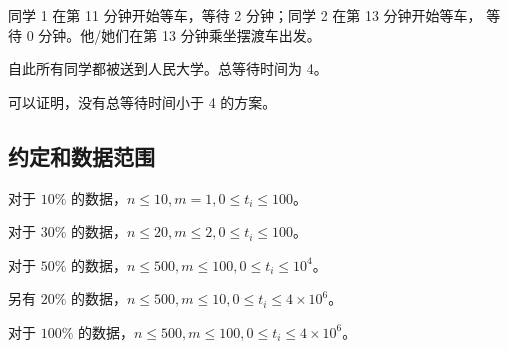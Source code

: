 \documentclass[UTF8]{ctexart}
\begin{document}
同学 1 在第 11 分钟开始等车，等待 2 分钟；同学 2 在第 13 分钟开始等车， 等待 0 分钟。他/她们在第 13 分钟乘坐摆渡车出发。

自此所有同学都被送到人民大学。总等待时间为 4。

可以证明，没有总等待时间小于 4 的方案。

\subsection{约定和数据范围}

对于 $10\%$ 的数据，$n\le 10,m=1,0\le t_i\le 100$。

对于 $30\%$ 的数据，$n\le 20,m\le 2,0\le t_i\le 100$。

对于 $50\%$ 的数据，$n\le 500,m\le 100,0\le t_i\le 10^4$。

另有 $20\%$ 的数据，$n\le 500,m\le 10,0\le t_i\le 4\times 10^6$。

对于 $100\%$ 的数据，$n\le 500,m\le 100,0\le t_i\le 4\times 10^6$。 
\end{document}
